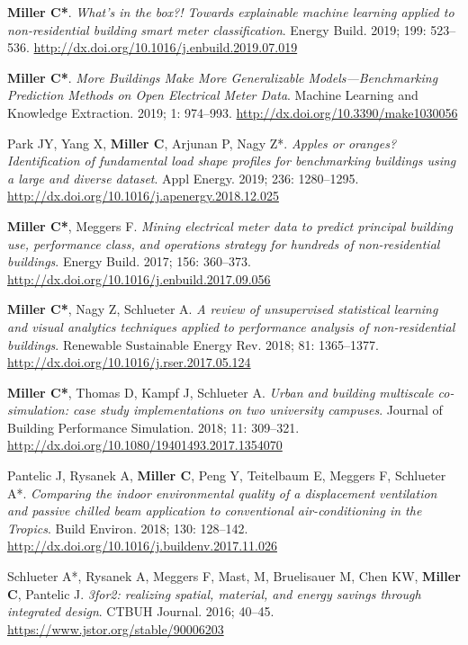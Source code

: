 \documentclass[10pt,a4paper]{article}
\begin{document}
\begin{small}
\begin{etaremune}
\item
\textbf{Miller C*}. \emph{What’s in the box?! Towards explainable machine learning applied to non-residential building smart meter classification}. Energy Build. 2019; 199: 523–536. \url{http://dx.doi.org/10.1016/j.enbuild.2019.07.019}
\item
\textbf{Miller C*}. \emph{More Buildings Make More Generalizable Models—Benchmarking Prediction Methods on Open Electrical Meter Data}. Machine Learning and Knowledge Extraction. 2019; 1: 974–993. \url{http://dx.doi.org/10.3390/make1030056}
\item
Park JY, Yang X, \textbf{Miller C}, Arjunan P, Nagy Z*. \emph{Apples or oranges? Identification of fundamental load shape profiles for benchmarking buildings using a large and diverse dataset}. Appl Energy. 2019; 236: 1280–1295. \url{http://dx.doi.org/10.1016/j.apenergy.2018.12.025}
\item
\textbf{Miller C*}, Meggers F. \emph{Mining electrical meter data to predict principal building use, performance class, and operations strategy for hundreds of non-residential buildings}. Energy Build. 2017; 156: 360–373. \url{http://dx.doi.org/10.1016/j.enbuild.2017.09.056}%
\item
\textbf{Miller C*}, Nagy Z, Schlueter A. \emph{A review of unsupervised statistical learning and visual analytics techniques applied to performance analysis of non-residential buildings}. Renewable Sustainable Energy Rev. 2018; 81: 1365–1377. \url{http://dx.doi.org/10.1016/j.rser.2017.05.124}
\item
\textbf{Miller C*}, Thomas D, Kampf J, Schlueter A. \emph{Urban and building multiscale co-simulation: case study implementations on two university campuses}. Journal of Building Performance Simulation. 2018; 11: 309–321. \url{http://dx.doi.org/10.1080/19401493.2017.1354070}
\item
Pantelic J, Rysanek A, \textbf{Miller C}, Peng Y, Teitelbaum E, Meggers F, Schlueter A*. \emph{Comparing the indoor environmental quality of a displacement ventilation and passive chilled beam application to conventional air-conditioning in the Tropics}. Build Environ. 2018; 130: 128–142. \url{http://dx.doi.org/10.1016/j.buildenv.2017.11.026}
\item
Schlueter A*, Rysanek A, Meggers F, Mast, M, Bruelisauer M, Chen KW, \textbf{Miller C}, Pantelic J. \emph{3for2: realizing spatial, material, and energy savings through integrated design}. CTBUH Journal. 2016; 40–45. \url{https://www.jstor.org/stable/90006203}

\end{etaremune}
\end{small}
\end{document}
